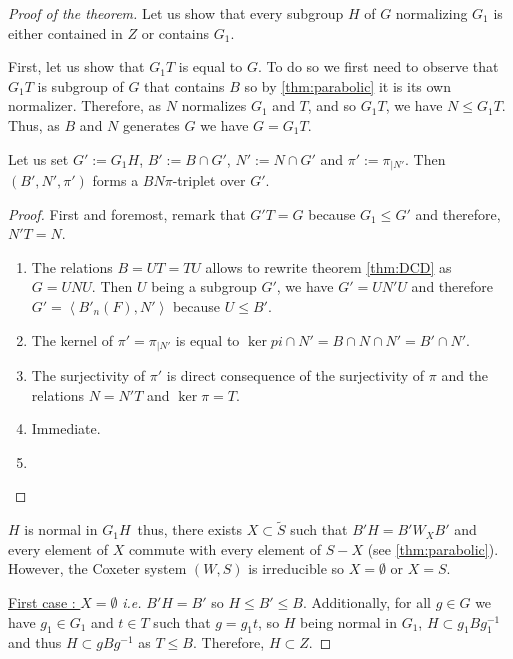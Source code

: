 \begin{proof}[Proof of the theorem]

Let us show that every subgroup $H$ of $G$ normalizing $G_1$ is either contained in $Z$ or contains $G_1$.

    First, let us show that $G_1T$ is equal to $G$. To do so we first need to observe that $G_1T$ is subgroup of $G$ that contains $B$  so by \ref{thm:parabolic} it is its own normalizer. Therefore, as $N$ normalizes $G_1$ and $T$, and so $G_1T$, we have $N \le G_{1}T$. Thus, as $B$ and $N$ generates $G$ we have $G = G_1T$.

    \begin{lemme} \label{lem:subBN}
        Let us set $G' := G_1 H$, $B' := B \cap G'$, $N' := N \cap G'$ and $\pi' := \pi_{|N'}$. 
        Then $\left( B', N', \pi' \right)$ forms a $BN\pi$-triplet over $G'$.
    \end{lemme}
    \begin{proof}
        First and foremost, remark that $G'T = G$ because $G_1 \le G'$ and therefore, $N'T = N$.
        \begin{enumerate}
            \item The relations $B=UT=TU$ allows to rewrite theorem \ref{thm:DCD} as $G = UNU$. Then $U$ being a subgroup $G'$, we have $G' = UN'U$ and therefore $G' = \left<B'_n(F),N' \right>$ because $U \le B'$.
            \item The kernel of $\pi' = \pi_{|N'}$ is equal to $\ker pi \cap N' = B \cap N \cap N' = B' \cap N' $.
            \item The surjectivity of $\pi'$ is direct consequence of the surjectivity of $\pi$ and the relations $N=N'T$ and $\ker \pi = T$.
            \item Immediate.
            \item {} 
        \end{enumerate}
    \end{proof}

   $H$ is normal in $G_1 H$\ thus, there exists $X \subset \tilde{S}$ such that $B'H = B' W_X B'$ and every element of $X$ commute with every element of $S-X$ (see \ref{thm:parabolic}). However, the Coxeter system $\left( W,S \right)$ is irreducible so $X = \emptyset$ or $X = S$.

     \underline{First case : $X = \emptyset$} \textit{i.e.} $B' H = B'$ so $H \le B' \le B$. Additionally, for all $g \in G$ we have $g_1 \in G_1$ and $t \in T$ such that $g = g_1 t$, so $H$ being normal in $G_1$, $H \subset g_1 B g_1^{-1}$ and thus $H \subset g B g^{-1}$ as $T \le B$. Therefore, $ H \subset Z$.


\end{proof}
